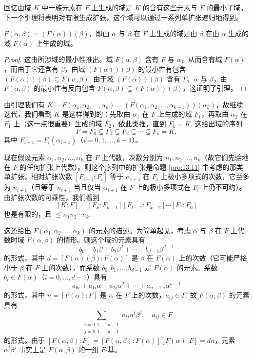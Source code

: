 回忆由域 \(K\) 中一族元素在 \(F\) 上生成的域是 \(K\) 的含有这些元素与 \(F\) 的最小子域。下一个引理将表明对有限生成扩张，这个域可以通过一系列单扩张递归地得到。

\begin{lemma}\label{lem:13.16}
\(F(\alpha, \beta) = (F(\alpha))(\beta)\)，即由 \(\alpha\) 与 \(\beta\) 在 \(F\) 上生成的域是由 \(\beta\) 在由 \(\alpha\) 生成的域 \(F(\alpha)\) 上生成的域。
\end{lemma}

\begin{proof}
这由所涉域的最小性推出。域 \(F(\alpha, \beta)\) 含有 \(F\) 与 \(\alpha\)，从而含有域 \(F(\alpha)\)，而由于它还含有 \(\beta\)，由域 \((F(\alpha))(\beta)\) 的最小性有包含 \((F(\alpha))(\beta) \subseteq F(\alpha, \beta)\). 由于域 \((F(\alpha))(\beta)\) 含有 \(F\)、\(\alpha\) 与 \(\beta\)，由 \(F(\alpha, \beta)\) 的最小性有反向包含 \(F(\alpha, \beta) \subseteq (F(\alpha))(\beta)\)，这证明了引理。
\end{proof}

由引理我们有 \(K = F(\alpha_1, \alpha_2, \ldots, \alpha_k) = (F(\alpha_1, \alpha_2, \ldots, \alpha_{k-1}))(\alpha_k)\)，故继续迭代，我们看到 \(K\) 是这样得到的：先取由 \(\alpha_1\) 在 \(F\) 上生成的域 \(F_1\)，再取由 \(\alpha_2\) 在 \(F_1\) 上（这一点很重要）生成的域 \(F_2\)，依此类推，直到 \(F_k = K\). 这给出域的序列
\[
F = F_0 \subseteq F_1 \subseteq F_2 \subseteq \cdots \subseteq F_k = K,
\]
其中 \(F_{i+1} = F_i(\alpha_{i+1})\)（\(i = 0, 1, \ldots, k-1\)）。

现在假设元素 \(\alpha_1, \alpha_2, \ldots, \alpha_k\) 在 \(F\) 上代数，次数分别为 \(n_1, n_2, \ldots, n_k\)（故它们先验地在 \(F\) 的任何扩张上代数）。则这个序列中的扩张是命题 \ref{pro:13.11} 中考虑的那类单扩张。相对扩张次数 \([F_{i+1}:F_i]\) 等于 \(\alpha_{i+1}\) 在 \(F_i\) 上极小多项式的次数，它至多为 \(n_{i+1}\)（且等于 \(n_{i+1}\) 当且仅当 \(\alpha_{i+1}\) 在 \(F\) 上的极小多项式在 \(F_i\) 上仍不可约）。由扩张次数的可乘性，我们看到
\[
[K:F] = [F_k:F_{k-1}][F_{k-1}:F_{k-2}]\cdots[F_1:F_0]
\]
也是有限的，且 \(\leq n_1n_2\cdots n_k\).

这还给出 \(F(\alpha_1, \alpha_2, \ldots, \alpha_k)\) 的元素的描述。为简单起见，考虑 \(\alpha\) 与 \(\beta\) 在 \(F\) 上代数时域 \(F(\alpha, \beta)\) 的情形。则这个域的元素具有
\[
b_0+b_1\beta+b_2\beta^2+\cdots+b_{d-1}\beta^{d-1}
\]
的形式，其中 \(d = [F(\alpha)(\beta):F(\alpha)]\) 是 \(\beta\) 在 \(F(\alpha)\) 上的次数（它可能严格小于 \(\beta\) 在 \(F\) 上的次数），而系数 \(b_0, b_1, \ldots, b_{d-1}\) 是 \(F(\alpha)\) 的元素。系数 \(b_i \in F(\alpha)\)（\(i = 0, \ldots, d-1\)）具有
\[
a_{0i}+a_{1i}\alpha+a_{2i}\alpha^2+\cdots+a_{n-1,i}\alpha^{n-1}
\]
的形式，其中 \(n = [F(\alpha):F]\) 是 \(\alpha\) 在 \(F\) 上的次数，\(a_{ij} \in F\). 故 \(F(\alpha, \beta)\) 的元素具有
\[
\sum_{\substack{i=0,1,\ldots,n-1 \\ j=0,1,\ldots,d-1}} a_{ij}\alpha^i\beta^j, \quad a_{ij} \in F
\]
的形式。由于 \([F(\alpha, \beta):F] = [F(\alpha, \beta):F(\alpha)][F(\alpha):F] = dn\)，元素 \(\alpha^i\beta^j\) 事实上是 \(F(\alpha, \beta)\) 的一组 \(F\)-基。


